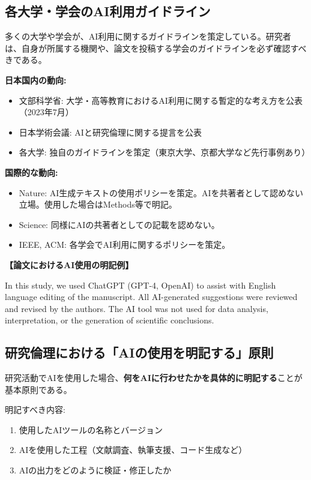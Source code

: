 \subsection{各大学・学会のAI利用ガイドライン}

多くの大学や学会が、AI利用に関するガイドラインを策定している。研究者は、自身が所属する機関や、論文を投稿する学会のガイドラインを必ず確認すべきである。

\textbf{日本国内の動向:}
\begin{itemize}
\item 文部科学省: 大学・高等教育におけるAI利用に関する暫定的な考え方を公表（2023年7月）\cite{MEXT2023AI}
\item 日本学術会議: AIと研究倫理に関する提言を公表
\item 各大学: 独自のガイドラインを策定（東京大学、京都大学など先行事例あり）
\end{itemize}

\textbf{国際的な動向:}
\begin{itemize}
\item Nature: AI生成テキストの使用ポリシーを策定。AIを共著者として認めない立場。使用した場合はMethods等で明記\cite{nature2023editorial}。
\item Science: 同様にAIの共著者としての記載を認めない。
\item IEEE, ACM: 各学会でAI利用に関するポリシーを策定。
\end{itemize}

\begin{promptbox}
\textbf{【論文におけるAI使用の明記例】}

In this study, we used ChatGPT (GPT-4, OpenAI) to assist with English language editing of the manuscript. All AI-generated suggestions were reviewed and revised by the authors. The AI tool was not used for data analysis, interpretation, or the generation of scientific conclusions.
\end{promptbox}

\subsection{研究倫理における「AIの使用を明記する」原則}

研究活動でAIを使用した場合、\textbf{何をAIに行わせたかを具体的に明記する}ことが基本原則である。

明記すべき内容:
\begin{enumerate}
\item 使用したAIツールの名称とバージョン
\item AIを使用した工程（文献調査、執筆支援、コード生成など）
\item AIの出力をどのように検証・修正したか
\end{enumerate}

